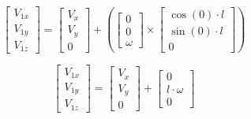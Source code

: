 \documentclass[answers]{exam}
\begin{document}
\begin{questions}
\begin{parts}
\begin{solution}
            \begin{equation*}
                \begin{bmatrix}
                    V_{1x} \\
                    V_{1y} \\
                    V_{1z}
                \end{bmatrix}
                = \begin{bmatrix}
                    V_x \\
                    V_y \\
                    0
                \end{bmatrix}
                + \left(\begin{bmatrix}
                    0 \\
                    0 \\
                    \omega
                \end{bmatrix} \times \begin{bmatrix}
                    \cos(0) \cdot l \\
                    \sin(0) \cdot l \\
                    0
                \end{bmatrix}\right)
            \end{equation*}

            \begin{equation*}
                \begin{bmatrix}
                    V_{1x} \\
                    V_{1y} \\
                    V_{1z}
                \end{bmatrix}
                = \begin{bmatrix}
                    V_x \\
                    V_y \\
                    0
                \end{bmatrix}
                + \begin{bmatrix}
                    0              \\
                    l \cdot \omega \\
                    0
                \end{bmatrix}
            \end{equation*}


\end{solution}
\end{parts}
\end{questions}
\end{document}
